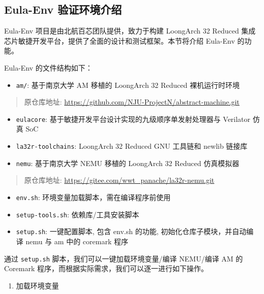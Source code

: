 \subsection{Eula-Env 验证环境介绍}\label{sec:04-toolchain-012}

Eula-Env 项目是由北航百芯团队提供，致力于构建 LoongArch 32 Reduced 集成芯片敏捷开发平台，提供了全面的设计和测试框架。本节将介绍 Eula-Env 的功能。

Eula-Env 的文件结构如下：

\begin{itemize}
\tightlist
\item
  \texttt{am/}: 基于南京大学 AM 移植的 LoongArch 32 Reduced 裸机运行时环境
\end{itemize}

\begin{quote}
原仓库地址: \url{https://github.com/NJU-ProjectN/abstract-machine.git}
\end{quote}

\begin{itemize}
\item
  \texttt{eulacore}: 基于敏捷开发平台设计实现的九级顺序单发射处理器与 Verilator 仿真 SoC
\item
  \texttt{la32r-toolchains}: LoongArch 32 Reduced GNU 工具链和 newlib 链接库
\item
  \texttt{nemu}: 基于南京大学 NEMU 移植的 LoongArch 32 Reduced 仿真模拟器
\end{itemize}

\begin{quote}
原仓库地址: \url{https://gitee.com/wwt_panache/la32r-nemu.git}
\end{quote}

\begin{itemize}
\item
  \texttt{env.sh}: 环境变量加载脚本，需在编译程序前使用
\item
  \texttt{setup-tools.sh}: 依赖库/工具安装脚本
\item
  \texttt{setup.sh}: 一键配置脚本, 包含 env.sh 的功能, 初始化仓库子模块，并自动编译 nemu 与 am 中的 coremark 程序
\end{itemize}

通过 \texttt{setup.sh} 脚本，我们可以一键加载环境变量/编译 NEMU/编译 AM 的 Coremark 程序，而根据实际需求，我们可以逐一进行如下操作。

\begin{enumerate}
\def\labelenumi{\arabic{enumi}.}
\tightlist
\item
  加载环境变量
\end{enumerate}

